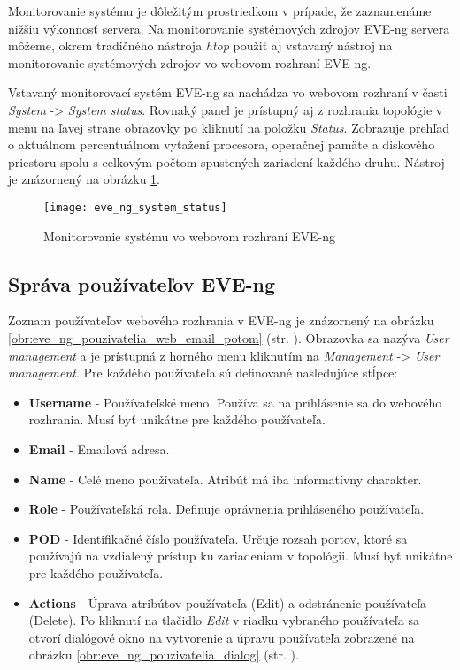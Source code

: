 Monitorovanie systému je dôležitým prostriedkom v prípade, že zaznamenáme nižšiu výkonnosť servera. Na monitorovanie systémových zdrojov EVE-ng servera môžeme, okrem tradičného nástroja \emph{htop} použiť aj vstavaný nástroj na monitorovanie systémových zdrojov vo webovom rozhraní EVE-ng.

Vstavaný monitorovací systém EVE-ng sa nachádza vo webovom rozhraní v časti \emph{System} -> \emph{System status}. Rovnaký panel je prístupný aj z rozhrania topológie v menu na ľavej strane obrazovky po kliknutí na položku \emph{Status}. Zobrazuje prehľad o aktuálnom percentuálnom vyťažení procesora, operačnej pamäte a diskového priestoru spolu s celkovým počtom spustených zariadení každého druhu. Nástroj je znázornený na obrázku \ref{obr:eve_ng_system_status}.

\begin{figure}
    \centering
    \texttt{[image: eve\_ng\_system\_status]}
    \caption{Monitorovanie systému vo webovom rozhraní EVE-ng}
    \label{obr:eve_ng_system_status}
\end{figure}




\subsection{Správa používateľov EVE-ng}

Zoznam používateľov webového rozhrania v EVE-ng je znázornený na obrázku \ref{obr:eve_ng_pouzivatelia_web_email_potom} (str. \pageref{obr:eve_ng_pouzivatelia_web_email_potom}). Obrazovka sa nazýva \emph{User management} a je prístupná z horného menu kliknutím na \emph{Management} -> \emph{User management}. Pre každého používateľa sú definované nasledujúce stĺpce:

\begin{itemize}
    \item \textbf{Username} - Používateľské meno. Používa sa na prihlásenie sa do webového rozhrania. Musí byť unikátne pre každého používateľa.
    \item \textbf{Email} - Emailová adresa.
    \item \textbf{Name} - Celé meno používateľa. Atribút má iba informatívny charakter.
    \item \textbf{Role} - Používateľská rola. Definuje oprávnenia prihláseného používateľa.
    \item \textbf{POD} - Identifikačné číslo používateľa. Určuje rozsah portov, ktoré sa používajú na vzdialený prístup ku zariadeniam v topológii. Musí byť unikátne pre každého používateľa.
    \item \textbf{Actions} - Úprava atribútov používateľa (Edit) a odstránenie používateľa (Delete). Po kliknutí na tlačidlo \emph{Edit} v riadku vybraného používateľa sa otvorí dialógové okno na vytvorenie a úpravu používateľa zobrazené na obrázku \ref{obr:eve_ng_pouzivatelia_dialog} (str. \pageref{obr:eve_ng_pouzivatelia_dialog}).
\end{itemize}

